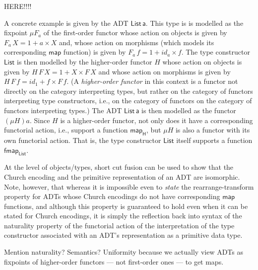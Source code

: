 \documentclass[acmsmall,screen,review,anonymous]{acmart}
\theoremstyle{definition}
\renewcommand{\id}{\mathit{id}}
\begin{document}
{\color{red} HERE!!!!}

\vspace*{1in}


A concrete example is given by the ADT $\mathsf{List\,a}$. This type
is is modelled as the fixpoint $\mu F_a$ of the first-order functor
whose action on objects is given by $F_a\,X = 1 + a \times X$ and,
whose action on morphisms (which models its corresponding
$\mathsf{map}$ function) is given by $F_a\,f = 1 + \id_a \times
f$. The type constructor $\mathsf{List}$ is then modelled by the
higher-order functor $H$ whose action on objects is given by $H\,F\,X
= 1 + X \times F\,X$ and whose action on morphisms is given by
$H\,F\,f = \id_1 + f \times F\,f$. (A {\em higher-order functor} in
this context is a functor not directly on the category interpreting
types, but rather on the category of functors interpreting type
constructors, i.e., on the category of functors on the category of
functors interpreting types.) The ADT $\mathsf{List\,a}$ is then
modelled as the functor $(\mu H)a$. Since $H$ is a higher-order
functor, not only does it have a corresponding functorial action,
i.e., support a function $\mathsf{map_H}$, but $\mu H$ is also a
functor with its own functorial action. That is, the type constructor
$\mathsf{List}$ itself supports a function $\mathsf{fmap_{List}}$.

{\color{blue} At the level of objects/types, short cut fusion can be
  used to show that the Church encoding and the primitive
  representation of an ADT are isomorphic.} Note, however, that
whereas it is impossible even to {\em state} the rearrange-transform
property for ADTs whose Church encodings do not have corresponding
$\mathsf{map}$ functions, and although this property is guaranteed to
hold even when it can be stated for Church encodings, it is simply the
reflection back into syntax of the naturality property of the
functorial action of the interpretation of the type constructor
associated with an ADT's representation as a primitive data type.

{\color{violet} Mention naturality? Semantics? Uniformity because we
  actually view ADTs as fixpoints of higher-order functors --- not
  first-order ones --- to get maps.}


\end{document}
